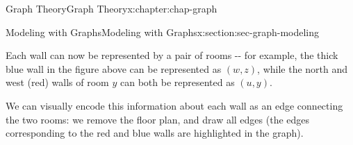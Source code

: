\documentclass[oneside,10pt,]{book}
\numberwithin{equation}{section}
\begin{document}
\begin{chapterptx}{Graph Theory}{}{Graph Theory}{}{}{x:chapter:chap-graph}
\begin{sectionptx}{Modeling with Graphs}{}{Modeling with Graphs}{}{}{x:section:sec-graph-modeling}
\par
Each wall can now be represented by a pair of rooms -{}-{} for example, the thick blue wall in the figure above can be represented as \((w,z)\), while the north and west (red) walls of room \(y\) can both be represented as \((u,y)\).%
\par
We can visually encode this information about each wall as an edge connecting the two rooms: we remove the floor plan, and draw all edges (the edges corresponding to the red and blue walls are highlighted in the graph).%
\begin{sidebyside}{1}{0.325}{0.325}{0}%
\begin{sbspanel}{0.35}%
\end{sbspanel}
\end{sidebyside}
\end{sectionptx}
\end{chapterptx}
\end{document}
